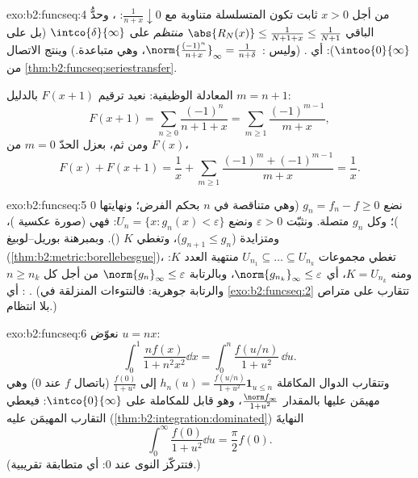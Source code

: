 \begin{solution}{exo:b2:funcseq:4}
من أجل $x > 0$ ثابت تكون المتسلسلة متناوبة مع $\frac{1}{n + x}
\downarrow 0$: ، وحدُّ الباقي
$\abs{R_N(x)} \leq \frac{1}{N + 1 + x} \leq \frac{1}{N+1}$
\emph{منتظم} على $\intco{\delta}{\infty}$ (بل على
$\intoo{0}{\infty}$): أي . (وليس :
$\norm{\frac{(-1)^n}{n+x}}_\infty = \frac{1}{n + \delta}$،
وهي متباعدة.) وينتج الاتصال من
\cref{thm:b2:funcseq:seriestransfer}.

المعادلة الوظيفية: نعيد ترقيم $F(x + 1)$ بالدليل $m = n + 1$:
\[
F(x+1) = \sum_{n\geq0} \frac{(-1)^n}{n + 1 + x}
= \sum_{m\geq1}\frac{(-1)^{m-1}}{m+x} ,
\]
ومن ثم، بعزل الحدّ $m = 0$ من $F(x)$،
\[
F(x) + F(x+1)
= \frac{1}{x} + \sum_{m\geq1}
\frac{(-1)^m + (-1)^{m-1}}{m+x} = \frac1x .
\]
\end{solution}

\begin{solution}{exo:b2:funcseq:5}
نضع $g_n = f_n - f \geq 0$ (وهي متناقصة في $n$ بحكم الفرض؛ ونهايتها
$0$ )؛ وكل $g_n$ متصلة. ونثبّت $\varepsilon
> 0$ ونضع $U_n = \{x : g_n(x) < \varepsilon\}$: فهي  (صورة عكسية
)، ومتزايدة ($g_{n+1} \leq g_n$)، وتغطي $K$
(). وبمبرهنة بوريل--لوبيغ
(\cref{thm:b2:metric:borellebesgue})، تغطي مجموعات $U_{n_1}
\subseteq \dots \subseteq U_{n_k}$ منتهية العدد $K$: ومنه $K = U_{n_k}$،
أي $\norm{g_{n_k}}_\infty \leq \varepsilon$، وبالرتابة
$\norm{g_n}_\infty \leq \varepsilon$ من أجل كل $n \geq n_k$: أي . (والرتابة جوهرية: فالنتوءات المنزلقة في
\cref{exo:b2:funcseq:2} تتقارب  على متراص بلا
انتظام.)
\end{solution}

\begin{solution}{exo:b2:funcseq:6}
نعوّض $u = nx$:
\[
\int_0^1 \frac{n f(x)}{1 + n^2x^2}\dd x
= \int_0^n \frac{f(u/n)}{1 + u^2}\,\dd u .
\]
وتتقارب الدوال المكامَلة $h_n(u) = \frac{f(u/n)}{1+u^2}\mathbf{1}_{u \leq n}$
 إلى $\frac{f(0)}{1+u^2}$ (باتصال $f$ عند
$0$) وهي مهيمَن عليها بالمقدار $\frac{\norm f_\infty}{1 + u^2}$،
وهو قابل للمكاملة على $\intco{0}{\infty}$: فيعطي التقارب المهيمَن عليه
(\cref{thm:b2:integration:dominated}) النهايةَ
\[
\int_0^\infty \frac{f(0)}{1 + u^2}\dd u = \frac{\pi}{2} f(0) .
\]
(فتتركّز النوى عند $0$: أي متطابقة تقريبية.)
\end{solution}

